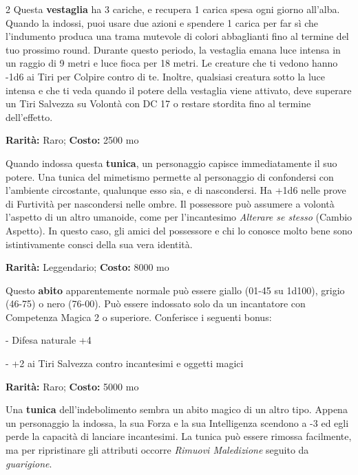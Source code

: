 \begin{multicols}{2}
Questa \textbf{vestaglia} ha 3 cariche, e recupera 1 carica spesa ogni giorno all'alba. Quando la indossi, puoi usare due azioni e spendere 1 carica per far sì che l'indumento produca una trama mutevole di colori abbaglianti fino al termine del tuo prossimo round. Durante questo periodo, la vestaglia emana luce intensa in un raggio di 9 metri e luce fioca per 18 metri. Le creature che ti vedono hanno -1d6 ai Tiri per Colpire contro di te. Inoltre, qualsiasi creatura sotto la luce intensa e che ti veda quando il potere della vestaglia viene attivato, deve superare un Tiri Salvezza su Volontà con DC 17 o restare stordita fino al termine dell'effetto.


\textbf{Rarità:} Raro; \textbf{Costo:} 2500 mo

Quando indossa questa \textbf{tunica}, un personaggio capisce immediatamente il suo potere. Una tunica del mimetismo permette al personaggio di confondersi con l'ambiente circostante, qualunque esso sia, e di nascondersi. Ha +1d6 nelle prove di Furtività per nascondersi nelle ombre. Il possessore può assumere a volontà l'aspetto di un altro umanoide, come per l'incantesimo \emph{Alterare se stesso} (Cambio Aspetto). In questo caso, gli amici del possessore e chi lo conosce molto bene sono istintivamente consci della sua vera identità.


\textbf{Rarità:} Leggendario; \textbf{Costo:} 8000 mo

Questo \textbf{abito} apparentemente normale può essere giallo (01-45 su 1d100), grigio (46-75) o nero (76-00). Può essere indossato solo da un incantatore con Competenza Magica 2 o superiore. Conferisce i seguenti bonus:

- Difesa naturale +4

- +2 ai Tiri Salvezza contro incantesimi e oggetti magici


\textbf{Rarità:} Raro; \textbf{Costo:} 5000 mo

Una \textbf{tunica} dell'indebolimento sembra un abito magico di un altro tipo. Appena un personaggio la indossa, la sua Forza e la sua Intelligenza scendono a -3 ed egli perde la capacità di lanciare incantesimi. La tunica può essere rimossa facilmente, ma per ripristinare gli attributi occorre \emph{Rimuovi Maledizione} seguito da \emph{guarigione}.


\end{multicols}
